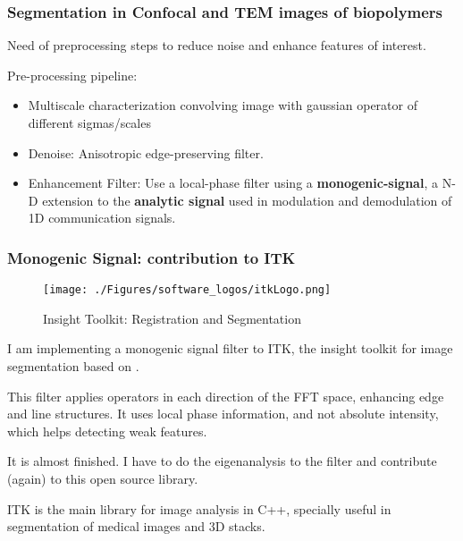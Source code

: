 \documentclass[9pt]{beamer}
\begin{document}
\begin{frame}[t]
  \frametitle{Segmentation in Confocal and TEM images of biopolymers}
     Need of preprocessing steps to reduce noise and enhance features of interest.
     \begin{exampleblock}{Pre-processing pipeline:}
     \begin{itemize}
       \item Multiscale characterization convolving image with gaussian operator of different sigmas/scales
       \item Denoise: Anisotropic edge-preserving filter.
       \item Enhancement Filter: Use a local-phase filter using a \textbf{monogenic-signal}, a N-D extension to the \textbf{analytic signal} used in modulation and demodulation of 1D communication signals.
     \end{itemize}
     \end{exampleblock}
\end{frame}

\begin{frame}[t]
  \frametitle{Monogenic Signal: contribution to ITK}
    \begin{figure}[h]
      \centering
      \texttt{[image: ./Figures/software\_logos/itkLogo.png]}
      \caption*{Insight Toolkit: Registration and Segmentation}
    \end{figure}
    I am implementing a monogenic signal filter to ITK, the insight toolkit for image segmentation based on \citep{chenouard_3d_2011}.

    This filter applies operators in each direction of the FFT space, enhancing edge and line structures.
    It uses local phase information, and not absolute intensity, which helps detecting weak features.

    It is almost finished. I have to do the eigenanalysis to the filter and contribute (again) to this open source library.

    ITK is the main library for image analysis in C++, specially useful in segmentation of medical images and 3D stacks.
\end{frame}
\end{document}
